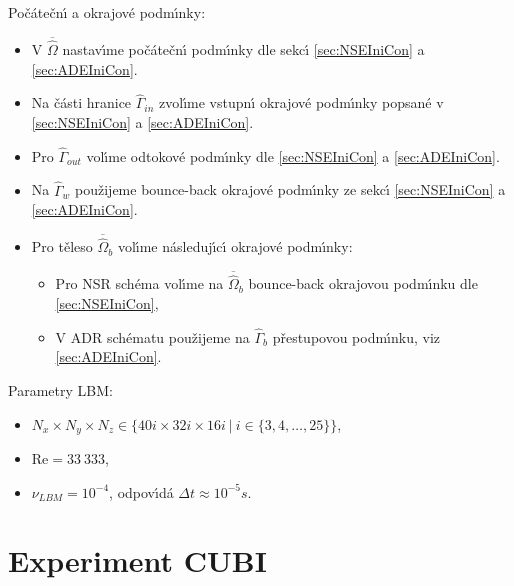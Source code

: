 \begin{tcolorbox}[colframe=blue, title = \'{U}loha \ref{sub:D10m5}]
                Po\v{c}\'{a}te\v{c}n\'{\i} a okrajov\'{e} podm\'{\i}nky:
                \begin{itemize}
                    \item V $\overline{\hat{\Omega}}$ nastav\'{\i}me po\v{c}\'{a}te\v{c}n\'{\i} podm\'{\i}nky dle sekc\'{\i} \ref{sec:NSEIniCon} a \ref{sec:ADEIniCon}.
                    \item Na \v{c}\'{a}sti hranice $\hat{\Gamma}_{in}$ zvol\'{\i}me vstupn\'{\i} okrajov\'{e} podm\'{\i}nky popsan\'{e} v \ref{sec:NSEIniCon} a \ref{sec:ADEIniCon}.
                    \item Pro $\hat{\Gamma}_{out}$ vol\'{\i}me odtokov\'{e} podm\'{\i}nky dle \ref{sec:NSEIniCon} a \ref{sec:ADEIniCon}.
                    \item Na $\hat{\Gamma}_{w}$ pou\v{z}ijeme bounce-back okrajov\'{e} podm\'{\i}nky ze sekc\'{\i} \ref{sec:NSEIniCon} a \ref{sec:ADEIniCon}.
                    \item Pro t\v{e}leso $\overline{\hat{\Omega}}_b$ vol\'{\i}me n\'{a}sleduj\'{\i}c\'{\i} okrajov\'{e} podm\'{\i}nky: \begin{itemize}
                        \item Pro NSR sch\'{e}ma vol\'{\i}me na $\overline{\hat{\Omega}}_b$ bounce-back okrajovou podm\'{\i}nku dle \ref{sec:NSEIniCon},
                        \item V ADR sch\'{e}matu pou\v{z}ijeme na $\hat{\Gamma}_b$ p\v{r}estupovou podm\'{\i}nku, viz \ref{sec:ADEIniCon}.  
                    \end{itemize}
                \end{itemize}
                
                Parametry LBM:
                \begin{itemize}
                    \item $N_x \times N_y \times N_z \in \{ 40i \times 32i \times 16i\ | \ i \in \{ 3,4,\dots,25 \} \} $,
                    \item $\mathrm{Re} = 33 \ 333$,
                    \item $\nu_{LBM} = 10^{-4}$, odpov\'{\i}d\'{a} $\Delta t \approx 10^{-5} s$.
                \end{itemize}

            \end{tcolorbox}

    \section{Experiment CUBI}

